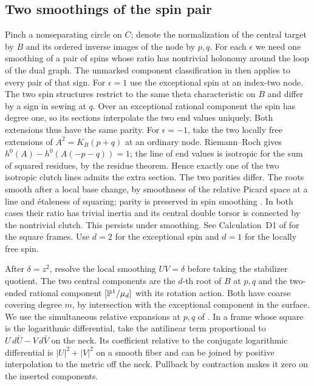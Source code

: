 \subsection{Two smoothings of the spin pair}
Pinch a nonseparating circle on \(C\); denote the normalization of
the central target by \(B\) and its ordered inverse images of the
node by \(p,q\). For each \(\epsilon\) we need one smoothing of a
pair of spins whose ratio has nontrivial holonomy around the loop
of the dual graph. The unmarked component classification in
\cite[Appendix~E]{WueUnramified} then applies to every pair of that sign.
For \(\epsilon=1\) use the exceptional spin at an index-two node.
The two spin structures restrict to the same theta characteristic
on \(B\) and differ by a sign in sewing at \(q\). Over an exceptional
rational component the spin has degree one, so its sections interpolate
the two end values uniquely. Both extensions thus have the same
parity. For \(\epsilon=-1\), take the two locally free extensions of
\(A^2=K_B(p+q)\) at an ordinary node. Riemann--Roch gives
\(h^0(A)-h^0(A(-p-q))=1\); the line of end values is isotropic for
the sum of squared residues, by the residue theorem. Hence exactly one
of the two isotropic clutch lines admits the extra section. The two
parities differ. The roots smooth after a local base change, by
smoothness of the relative Picard space at a line and étaleness of
squaring; parity is preserved in spin smoothing \cite[\S6]{cornalba}. In both cases their
ratio has trivial inertia and its central double torsor is connected
by the nontrivial clutch. This persists under smoothing. See
Calculation~D1 of \cite{WueSupplement} for the square frames.
Use \(d=2\) for the exceptional spin and \(d=1\) for the locally free
spin.

After \(\delta=z^2\), resolve the local smoothing \(UV=\delta\)
before taking the stabilizer quotient. The two central components
are the \(d\)-th root of \(B\) at \(p,q\) and the two-ended
rational component \([\mathbb P^1/\mu_d]\) with its rotation action.
Both have coarse covering degree \(m\), by intersection with the
exceptional component in the surface. We use the simultaneous
relative expansions at \(p,q\) of \cite[\S\S4.4--4.7]{af}.
In a frame whose square is the logarithmic differential, take the
antilinear term proportional to \(U\,d\bar U-V\,d\bar V\) on the neck.
Its coefficient relative to the conjugate logarithmic differential is
\(|U|^2+|V|^2\) on a smooth fiber and can be joined by positive
interpolation to the metric off the neck. Pullback by contraction
makes it zero on the inserted components.

